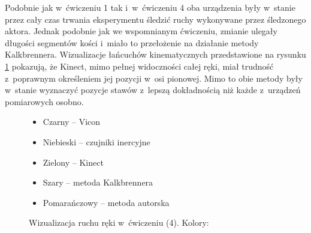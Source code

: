 Podobnie jak w~ćwiczeniu 1 tak i~w~ćwiczeniu 4 oba urządzenia były w~stanie przez cały czas trwania eksperymentu śledzić ruchy wykonywane przez śledzonego aktora. Jednak podobnie jak we wspomnianym ćwiczeniu, zmianie ulegały długości segmentów kości i~miało to przełożenie na działanie metody Kalkbrennera. Wizualizacje łańcuchów kinematycznych przedstawione na rysunku \ref{fig:experiments:four} pokazują, że Kinect, mimo pełnej widoczności całej ręki, miał trudność z~poprawnym określeniem jej pozycji w~osi pionowej. Mimo to obie metody były w~stanie wyznaczyć pozycje stawów z~lepszą dokładnością niż każde z~urządzeń pomiarowych osobno.
\begin{figure}[!htb]
	\captionsetup{singlelinecheck=off}
	\centering
	\caption[Wizualizacja ruchu ręki w~ćwiczeniu (4)]{Wizualizacja ruchu ręki w~ćwiczeniu (4). Kolory:}	
	\label{fig:experiments:four}
	\begin{itemize}
		\item Czarny -- Vicon
		\item Niebieski -- czujniki inercyjne
		\item Zielony -- Kinect
		\item Szary -- metoda Kalkbrennera
		\item Pomarańczowy -- metoda autorska
	\end{itemize}
\end{figure}

